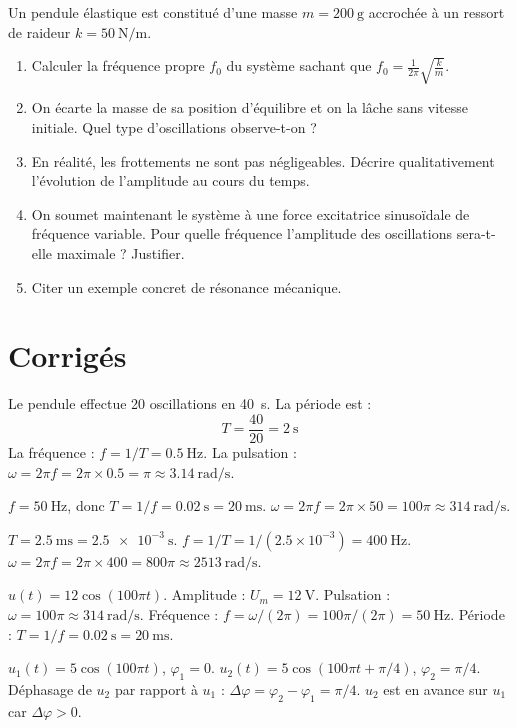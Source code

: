 Un pendule élastique est constitué d'une masse $m = \SI{200}{\gram}$ accrochée à un ressort de raideur $k = \SI{50}{\newton\per\metre}$.

\begin{enumerate}
\item Calculer la fréquence propre $f_0$ du système sachant que $f_0 = \frac{1}{2\pi}\sqrt{\frac{k}{m}}$.
\item On écarte la masse de sa position d'équilibre et on la lâche sans vitesse initiale. Quel type d'oscillations observe-t-on ?
\item En réalité, les frottements ne sont pas négligeables. Décrire qualitativement l'évolution de l'amplitude au cours du temps.
\item On soumet maintenant le système à une force excitatrice sinusoïdale de fréquence variable. Pour quelle fréquence l'amplitude des oscillations sera-t-elle maximale ? Justifier.
\item Citer un exemple concret de résonance mécanique.
\end{enumerate}

\section{Corrigés}

Le pendule effectue 20 oscillations en \SI{40}{\second}. La période est :
\[
T = \frac{40}{20} = \SI{2}{\second}
\]
La fréquence : $f = 1/T = \SI{0.5}{\hertz}$.
La pulsation : $\omega = 2\pi f = 2\pi \times 0.5 = \pi \approx \SI{3.14}{\radian\per\second}$.

$f = \SI{50}{\hertz}$, donc $T = 1/f = \SI{0.02}{\second} = \SI{20}{\milli\second}$.
$\omega = 2\pi f = 2\pi \times 50 = 100\pi \approx \SI{314}{\radian\per\second}$.

$T = \SI{2.5}{\milli\second} = \SI{2.5e-3}{\second}$.
$f = 1/T = 1/(2.5\times 10^{-3}) = \SI{400}{\hertz}$.
$\omega = 2\pi f = 2\pi \times 400 = 800\pi \approx \SI{2513}{\radian\per\second}$.

$u(t) = 12\cos(100\pi t)$.
Amplitude : $U_m = \SI{12}{\volt}$.
Pulsation : $\omega = 100\pi \approx \SI{314}{\radian\per\second}$.
Fréquence : $f = \omega/(2\pi) = 100\pi/(2\pi) = \SI{50}{\hertz}$.
Période : $T = 1/f = \SI{0.02}{\second} = \SI{20}{\milli\second}$.

$u_1(t) = 5\cos(100\pi t)$, $\varphi_1 = 0$.
$u_2(t) = 5\cos(100\pi t + \pi/4)$, $\varphi_2 = \pi/4$.
Déphasage de $u_2$ par rapport à $u_1$ : $\Delta\varphi = \varphi_2 - \varphi_1 = \pi/4$.
$u_2$ est en avance sur $u_1$ car $\Delta\varphi > 0$.

